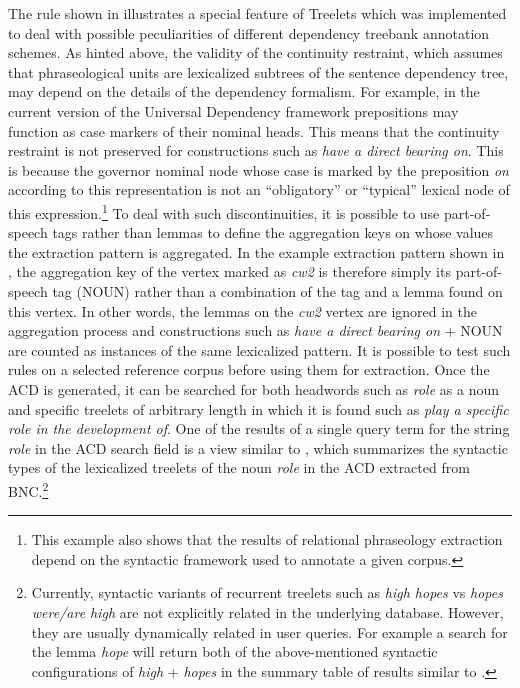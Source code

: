 \documentclass[output=paper]{langscibook}
\begin{document}
The rule shown in  illustrates a special feature of Treelets which was implemented to deal with possible peculiarities of different dependency treebank annotation schemes. As hinted above, the validity of the continuity restraint, which assumes that phraseological units are lexicalized subtrees of the sentence dependency tree, may depend on the details of the dependency formalism. For example, in the current version of the Universal Dependency framework prepositions may function as case markers of their nominal heads. This means that the continuity restraint is not preserved for constructions such as \textit{have a direct bearing on}. This is because the governor nominal node whose case is marked by the preposition \textit{on} according to this representation is not an ``obligatory'' or ``typical'' lexical node of this expression.\footnote{This example also shows that the results of relational phraseology extraction depend on the syntactic framework used to annotate a given corpus.} To deal with such discontinuities, it is possible to use part-of-speech tags rather than lemmas to define the aggregation keys on whose values the extraction pattern is aggregated. In the example extraction pattern shown in , the aggregation key of the vertex marked as \textit{cw2} is therefore simply its part-of-speech tag (NOUN) rather than a combination of the tag and a lemma found on this vertex. In other words, the lemmas on the \textit{cw2} vertex are ignored in the aggregation process and constructions such as \textit{have a direct bearing on} + NOUN are counted as instances of the same lexicalized pattern. It is possible to test such rules on a selected reference corpus before using them for extraction. Once the ACD is generated, it can be searched for both headwords such as \textit{role} as a noun and specific treelets of arbitrary length in which it is found such as \textit{play a specific role in the development of}. One of the results of a single query term for the string \textit{role} in the ACD search field is a view similar to , which summarizes the syntactic types of the lexicalized treelets of the noun \textit{role} in the ACD extracted from BNC.\footnote{\textrm{Currently, syntactic variants of recurrent treelets such as} \textrm{\textit{high hopes}} \textrm{vs} \textrm{\textit{hopes were/are high}} \textrm{are not explicitly related in the underlying database. However, they are usually dynamically related in user queries. For example a search for the lemma \textit{hope} will return both of the above-mentioned syntactic configurations of \textit{high} + \textit{hopes} in the summary table of results similar to .}} 
\end{document}
